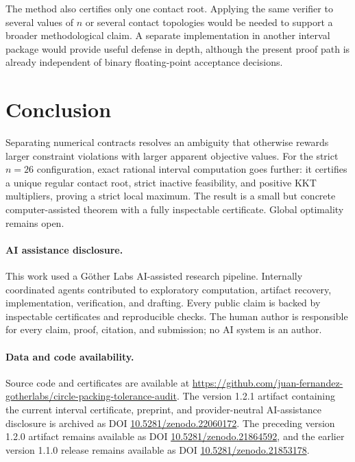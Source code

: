 \documentclass[11pt]{article}
\begin{document}
The method also certifies only one contact root.  Applying the same verifier to
several values of $n$ or several contact topologies would be needed to support
a broader methodological claim.  A separate implementation in another
interval package would provide useful defense in depth, although the present
proof path is already independent of binary floating-point acceptance
decisions.

\section{Conclusion}

Separating numerical contracts resolves an ambiguity that otherwise rewards
larger constraint violations with larger apparent objective values.  For the
strict $n=26$ configuration, exact rational interval computation goes further:
it certifies a unique regular contact root, strict inactive feasibility, and
positive KKT multipliers, proving a strict local maximum.  The result is a
small but concrete computer-assisted theorem with a fully inspectable
certificate.  Global optimality remains open.

\paragraph{AI assistance disclosure.}
This work used a G\"other Labs AI-assisted research pipeline.  Internally
coordinated agents contributed to exploratory computation, artifact recovery,
implementation, verification, and drafting.  Every public claim is backed by
inspectable certificates and reproducible checks.  The human author is
responsible for every claim, proof, citation, and submission; no AI system is
an author.

\paragraph{Data and code availability.}
Source code and certificates are available at
\url{https://github.com/juan-fernandez-gotherlabs/circle-packing-tolerance-audit}.
The version 1.2.1 artifact containing the current interval certificate,
preprint, and provider-neutral AI-assistance disclosure is archived as DOI
\href{https://doi.org/10.5281/zenodo.22060172}{10.5281/zenodo.22060172}.
The preceding version 1.2.0 artifact remains available as DOI
\href{https://doi.org/10.5281/zenodo.21864592}{10.5281/zenodo.21864592}, and the
earlier version 1.1.0 release remains available as DOI
\href{https://doi.org/10.5281/zenodo.21853178}{10.5281/zenodo.21853178}.
\end{document}
